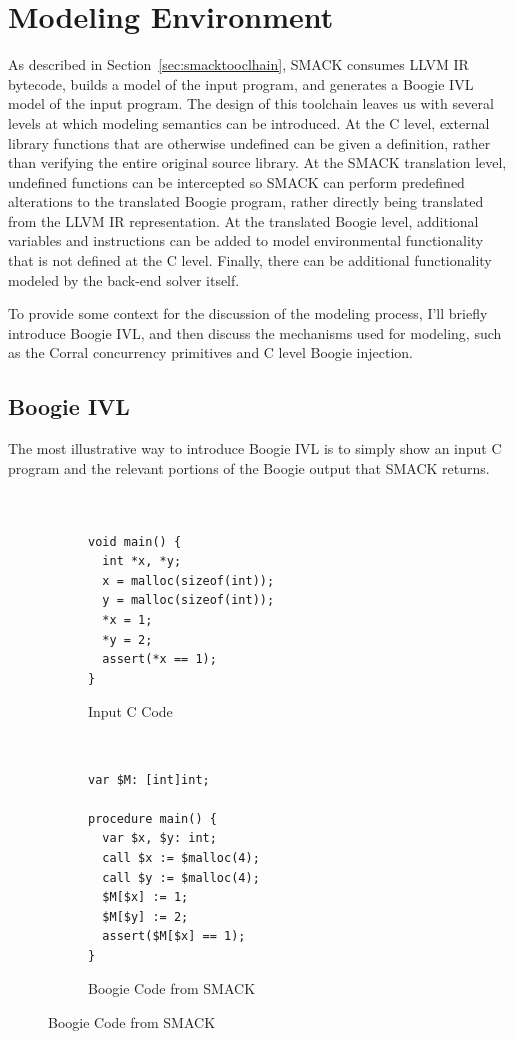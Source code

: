 \section{Modeling Environment}\label{sec:modelingenvironment}
As described in Section~\ref{sec:smacktooclhain}, SMACK consumes LLVM
IR bytecode, builds a model of the input program, and generates a
Boogie IVL model of the input program.  The design of this toolchain
leaves us with several levels at which modeling semantics can be
introduced. At the C level, external library functions that are
otherwise undefined can be given a definition, rather than verifying
the entire original source library. At the SMACK translation level,
undefined functions can be intercepted so SMACK can perform predefined
alterations to the translated Boogie program, rather directly being
translated from the LLVM IR representation.  At the translated Boogie
level, additional variables and instructions can be added to model
environmental functionality that is not defined at the C
level. Finally, there can be additional functionality modeled by the
back-end solver itself. 

To provide some context for the discussion of the modeling process,
I'll briefly introduce Boogie IVL, and then discuss the mechanisms
used for modeling, such as the Corral concurrency primitives and C
level Boogie injection.

\subsection{Boogie IVL}
The most illustrative way to introduce Boogie IVL is to simply show an
input C program and the relevant portions of the Boogie output that
SMACK returns. 
\begin{figure}[h]
\centering
\caption{SMACK Translation of C Program}\label{fig:cToBoogie}
\begin{subfigure}[b]{.45\textwidth}
\centering
\caption{Input C Code}\label{fig:cToBoogie_a}
\begin{lstlisting}


void main() {
  int *x, *y;
  x = malloc(sizeof(int));
  y = malloc(sizeof(int));
  *x = 1;
  *y = 2;
  assert(*x == 1);
}
\end{lstlisting}
\end{subfigure}
~
\begin{subfigure}[b]{.45\textwidth}
\centering
\caption{Boogie Code from SMACK}\label{fig:cToBoogie_b}
\begin{lstlisting}[language=boogie]
var $M: [int]int;

procedure main() {
  var $x, $y: int;
  call $x := $malloc(4);
  call $y := $malloc(4);
  $M[$x] := 1;
  $M[$y] := 2;
  assert($M[$x] == 1);
}
\end{lstlisting}
\end{subfigure}
\end{figure}

